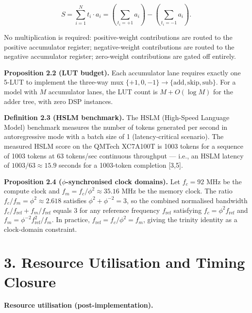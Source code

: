 \[S = \sum_{i=1}^{N} t_i \cdot a_i = \left(\sum_{t_i=+1} a_i\right) - \left(\sum_{t_i=-1} a_i\right).\]

No multiplication is required: positive-weight
contributions are routed to the positive
accumulator register; negative-weight
contributions are routed to the negative
accumulator register; zero-weight contributions
are gated off entirely.

\textbf{Proposition 2.2 (LUT budget).} Each
accumulator lane requires exactly one 5-LUT to
implement the three-way mux
\(\{+1, 0, -1\} \to \{\text{add}, \text{skip}, \text{sub}\}\).
For a model with \(M\) accumulator lanes, the LUT
count is \(M + O(\log M)\) for the adder tree,
with zero DSP instances.

\textbf{Definition 2.3 (HSLM benchmark).} The HSLM
(High-Speed Language Model) benchmark measures the
number of tokens generated per second in
autoregressive mode with a batch size of 1
(latency-critical scenario). The measured HSLM
score on the QMTech XC7A100T is 1003 tokens for a
sequence of 1003 tokens at 63 tokens/sec
continuous throughput --- i.e., an HSLM latency of
\(1003/63 \approx 15.9\) seconds for a 1003-token
completion [3,5].

\textbf{Proposition 2.4 (\(\phi\)-synchronised
clock domains).} Let \(f_c = 92\) MHz be the
compute clock and
\(f_m = f_c / \phi^2 \approx 35.16\) MHz be the
memory clock. The ratio
\(f_c/f_m = \phi^2 \approx 2.618\) satisfies
\(\phi^2 + \phi^{-2} = 3\), so the combined
normalised bandwidth
\(f_c/f_{\text{ref}} + f_m/f_{\text{ref}}\) equals
3 for any reference frequency \(f_{\text{ref}}\)
satisfying \(f_c = \phi^2 f_{\text{ref}}\) and
\(f_m = \phi^{-2} f_{\text{ref}}^2/f_m\). In
practice, \(f_{\text{ref}} = f_c / \phi^2 = f_m\),
giving the trinity identity as a clock-domain
constraint.

\section{3. Resource Utilisation and Timing
Closure}\label{fa_28:resource-utilisation-and-timing-closure}

\textbf{Resource utilisation
(post-implementation).}

